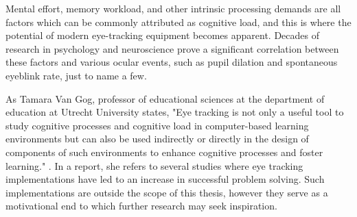 Mental effort, memory workload, and other intrinsic processing demands are all factors which can be commonly attributed as cognitive load, and this is where the potential of modern eye-tracking equipment becomes apparent. Decades of research in psychology and neuroscience prove a significant correlation between these factors and various ocular events, such as pupil dilation and spontaneous eyeblink rate, just to name a few. 

As Tamara Van Gog, professor of educational sciences at the department of education at Utrecht University states, "Eye tracking is not only a useful tool to study cognitive processes and cognitive load in computer-based learning environments but can also be used indirectly or directly in the design of components of such environments to enhance cognitive processes and foster learning." \cite{vanGog2013}. In a report, she refers to several studies where eye tracking implementations have led to an increase in successful problem solving. Such implementations are outside the scope of this thesis, however they serve as a motivational end to which further research may seek inspiration.